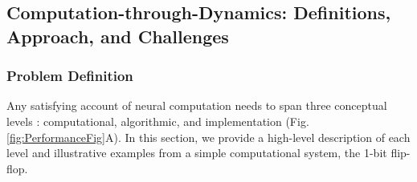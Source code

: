 \documentclass{article}
\begin{document}
\subsection{Computation-through-Dynamics: Definitions, Approach, and Challenges \label{Theory}}
\vspace{-0.4cm}

\subsubsection{Problem Definition}
\vspace{-0.3cm}

Any satisfying account of neural computation needs to span three conceptual levels \cite{marr2010vision}: computational, algorithmic, and implementation (Fig. \ref{fig:PerformanceFig}A). In this section, we provide a high-level description of each level and illustrative examples from a simple computational system, the 1-bit flip-flop.
\end{document}
